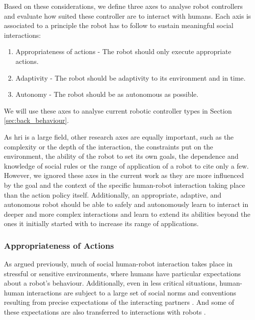    Based on these considerations, we define three axes to analyse robot controllers and evaluate how suited these controller are to interact with humans. Each axis is associated to a principle the robot has to follow to sustain meaningful social interactions:
    \begin{enumerate}
    	\item Appropriateness of actions - The robot should only execute appropriate actions.
    	\item Adaptivity - The robot should be adaptivity to its environment and in time.
    	\item Autonomy - The robot should be as autonomous as possible.
    \end{enumerate}
    We will use these axes to analyse current robotic controller types in Section \ref{sec:back_behaviour}.    
    
    As \gls{hri} is a large field, other research axes are equally important, such as the complexity or the depth of the interaction, the constraints put on the environment, the ability of the robot to set its own goals, the dependence and knowledge of social rules or the range of application of a robot to cite only a few. However, we ignored these axes in the current work as they are more influenced by the goal and the context of the specific human-robot interaction taking place than the action policy itself. Additionally, an appropriate, adaptive, and autonomous robot should be able to safely and autonomously learn to interact in deeper and more complex interactions and learn to extend its abilities beyond the ones it initially started with to increase its range of applications.

\subsubsection{Appropriateness of Actions} \label{ssec:appropriateness} %
    As argued previously, much of social human-robot interaction takes place in  stressful or sensitive environments, where humans have particular expectations about a robot's behaviour. Additionally, even in less critical situations, human-human interactions are subject to a large set of social norms and conventions resulting from precise expectations of the interacting partners \citep{sherif1936psychology}. And some of these expectations are also transferred to interactions with robots \citep{bartneck2004design}.
    
